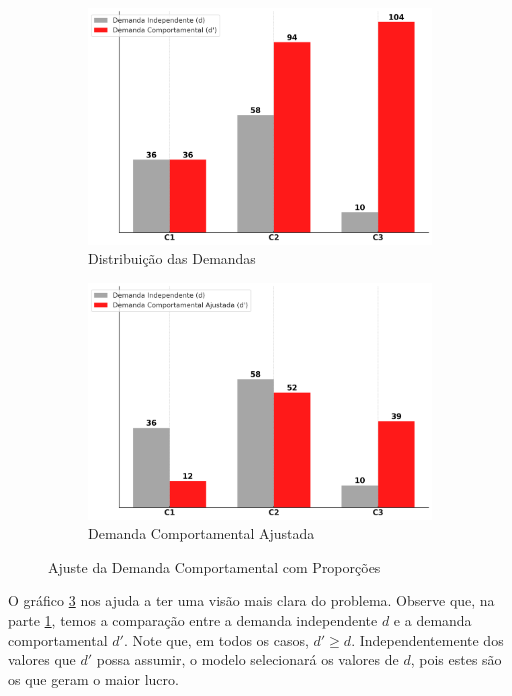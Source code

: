 \begin{figure}[H]
	\centering
	\begin{subfigure}[b]{0.45\linewidth}
		\includegraphics[width=\linewidth]{img/dem_classes.png}
		\caption{Distribuição das Demandas}
		\label{fig:dem_classes}
	\end{subfigure}\hspace{5mm}
	\begin{subfigure}[b]{0.45\linewidth}
		\includegraphics[width=\linewidth]{img/dem_redistri.png}
		\caption{Demanda Comportamental Ajustada}
		\label{fig:dem_redistri}
	\end{subfigure}
	\caption{Ajuste da Demanda Comportamental com Proporções}
	\label{fig: ajustes_demanda}
\end{figure}

O gráfico \ref{fig: ajustes_demanda} nos ajuda a ter uma visão mais clara do problema. Observe que, na parte \ref{fig:dem_classes}, temos a comparação entre a demanda independente $d$ e a demanda comportamental $d'$. Note que, em todos os casos, $d' \geq d$. Independentemente dos valores que $d'$ possa assumir, o modelo selecionará os valores de $d$, pois estes são os que geram o maior lucro.

